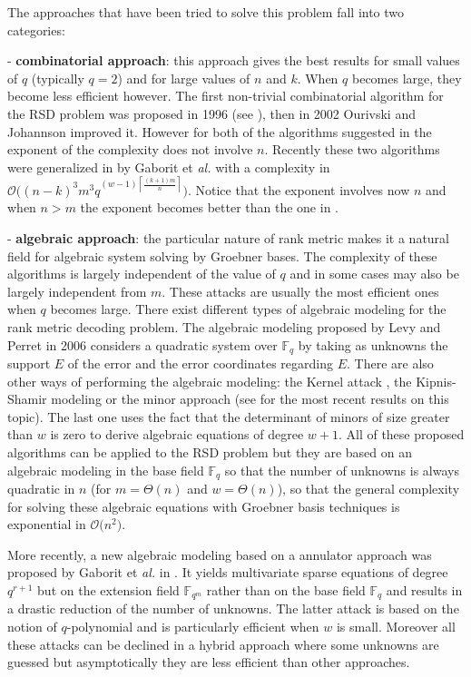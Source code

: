 \documentclass[11pt, a4paper]{llncs}
\newcommand{\Ceil}[1]{\left\lceil #1 \right\rceil}
\newcommand{\Fq}{\mathbb{F}_q}
\newcommand{\Fqm}{\mathbb{F}_{q^m}}
\newcommand{\OO}[1]{\mathcal{O}\big( #1 \big)}
\begin{document}
The approaches that have been tried to solve this problem fall into two categories:

- {\bf combinatorial approach}: this approach gives the best results  for small values
of $q$ (typically $q=2$) and for large values of $n$ and $k$.
When $q$ becomes large, they become less efficient however.
The first non-trivial combinatorial algorithm for the RSD problem was proposed in 1996 (see  \cite{CS96}),
then in 2002 Ourivski and Johannson \cite{OJ02} improved it. However for both of the algorithms
suggested in \cite{OJ02} the exponent of the complexity does not involve $n$. Recently these two algorithms were generalized in \cite{GRS13} by Gaborit et {\it al.}
with a complexity in $\OO{(n-k)^3m^3q^{(w-1)\Ceil{\frac{(k+1)m}{n}}}}$.
Notice that the exponent involves now $n$ and when $n>m$
the exponent becomes better than the one in \cite{OJ02}. 

- {\bf algebraic approach}: the particular nature of rank metric makes it a natural field
for algebraic system solving  by Groebner bases. The complexity of these algorithms
is largely independent of the value of $q$
and in some cases may also be largely independent from $m$.
These attacks are usually the most efficient ones when $q$ becomes large.
There exist different types of algebraic modeling for the rank metric decoding problem. 
The algebraic modeling proposed by Levy and Perret \cite{LP06} in 2006 
considers a quadratic system over $\Fq$ 
by taking as unknowns the support $E$ of the error and the error
coordinates regarding $E$. There are also other  ways of performing the algebraic modeling:  
the Kernel attack  \cite{C01,GC00},  the Kipnis-Shamir modeling \cite{KS99} or the minor approach
(see \cite{S12} for the most recent results on this topic). 
The last one uses the fact that the determinant of minors of size greater than $w$
is zero to derive algebraic equations of degree $w+1$. All of these proposed algorithms can be applied
to  the RSD problem but they are based on an algebraic modeling in the base field $\Fq$
so that the number of unknowns is always quadratic in $n$ (for $m=\Theta(n)$
and  $w=\Theta(n)$), so that the general complexity for solving these algebraic equations with Groebner basis techniques
is exponential in $\OO{n^2}$.

More recently, a new algebraic modeling based on a  annulator approach was proposed by Gaborit et {\it al.} in \cite{GRS13}.
It yields multivariate sparse equations of degree $q^{r+1}$ but on the extension field
$\Fqm$ rather than on the base field $\Fq$ and results in a drastic reduction of the number of 
unknowns. The latter attack is based on the
notion of $q$-polynomial and is particularly efficient when $w$ is small.
Moreover all these attacks can be declined in a hybrid approach where some
unknowns are guessed but asymptotically they are less efficient than other approaches.
\end{document}
